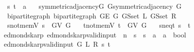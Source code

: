 \begin{isabellebody}
\ \ \ s\ t\ {\isacharcolon}{\kern0pt}{\isacharcolon}{\kern0pt}\ {\isacharprime}{\kern0pt}a\isanewline
\ \ \ symmetric{\isacharunderscore}{\kern0pt}adjacency{\isacharunderscore}{\kern0pt}G{\isacharcolon}{\kern0pt}\ {\isachardoublequoteopen}G{\isachardot}{\kern0pt}symmetric{\isacharunderscore}{\kern0pt}adjacency{\isacharprime}{\kern0pt}\ G{\isachardoublequoteclose}\isanewline
\ \ \ bipartite{\isacharunderscore}{\kern0pt}graph{\isacharcolon}{\kern0pt}\ {\isachardoublequoteopen}bipartite{\isacharunderscore}{\kern0pt}graph\ {\isacharparenleft}{\kern0pt}G{\isachardot}{\kern0pt}E\ G{\isacharparenright}{\kern0pt}\ {\isacharparenleft}{\kern0pt}G{\isachardot}{\kern0pt}S{\isachardot}{\kern0pt}set\ L{\isacharparenright}{\kern0pt}\ {\isacharparenleft}{\kern0pt}G{\isachardot}{\kern0pt}S{\isachardot}{\kern0pt}set\ R{\isacharparenright}{\kern0pt}{\isachardoublequoteclose}\isanewline
\ \ \ s{\isacharunderscore}{\kern0pt}not{\isacharunderscore}{\kern0pt}mem{\isacharunderscore}{\kern0pt}V{\isacharcolon}{\kern0pt}\ {\isachardoublequoteopen}s\ {\isasymnotin}\ G{\isachardot}{\kern0pt}V\ G{\isachardoublequoteclose}\isanewline
\ \ \ t{\isacharunderscore}{\kern0pt}not{\isacharunderscore}{\kern0pt}mem{\isacharunderscore}{\kern0pt}V{\isacharcolon}{\kern0pt}\ {\isachardoublequoteopen}t\ {\isasymnotin}\ G{\isachardot}{\kern0pt}V\ G{\isachardoublequoteclose}\isanewline
\ \ \ s{\isacharunderscore}{\kern0pt}neq{\isacharunderscore}{\kern0pt}t{\isacharcolon}{\kern0pt}\ {\isachardoublequoteopen}s\ {\isasymnoteq}\ t{\isachardoublequoteclose}\isanewline
%
\isadeliminvisible
\isanewline
%
\endisadeliminvisible
%
\isataginvisible
{}\isamarkupfalse%
\ {\isacharparenleft}{\kern0pt}\ edmonds{\isacharunderscore}{\kern0pt}karp{\isacharparenright}{\kern0pt}\ edmonds{\isacharunderscore}{\kern0pt}karp{\isacharunderscore}{\kern0pt}valid{\isacharunderscore}{\kern0pt}input{\isacharprime}{\kern0pt}\ {\isacharcolon}{\kern0pt}{\isacharcolon}{\kern0pt}\ {\isachardoublequoteopen}{\isacharprime}{\kern0pt}n\ {\isasymRightarrow}\ {\isacharprime}{\kern0pt}s\ {\isasymRightarrow}\ {\isacharprime}{\kern0pt}s\ {\isasymRightarrow}\ {\isacharprime}{\kern0pt}a\ {\isasymRightarrow}\ {\isacharprime}{\kern0pt}a\ {\isasymRightarrow}\ bool{\isachardoublequoteclose}\ \isanewline
\ \ {\isachardoublequoteopen}edmonds{\isacharunderscore}{\kern0pt}karp{\isacharunderscore}{\kern0pt}valid{\isacharunderscore}{\kern0pt}input{\isacharprime}{\kern0pt}\ G\ L\ R\ s\ t\ {\isasymequiv}\isanewline

\end{isabellebody}
